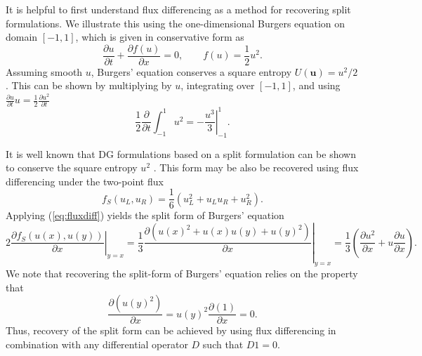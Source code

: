 \documentclass[preprint,10pt]{article}
\theoremstyle{definition}
\theoremstyle{lemma}
\theoremstyle{theorem}
\theoremstyle{assumption}
\newcommand{\pd}[2]{\frac{\partial#1}{\partial#2}}
\newcommand{\LRp}[1]{\left( #1 \right)}
\newcommand{\note}[1]{{\color{blue}{#1}}}
\begin{document}

It is helpful to first understand flux differencing as a method for recovering split formulations.  We illustrate this using the one-dimensional Burgers equation on domain $ [-1,1]$, which is given in conservative form as 
\[
\pd{u}{t} + \pd{f(u)}{x} = 0, \qquad f(u) = \frac{1}{2}u^2.
\]
Assuming smooth $u$, Burgers' equation conserves a square entropy $U(\bm{u}) = u^2/2$.   This can be shown by multiplying by $u$, integrating over $[-1,1]$, and using $\pd{u}{t}u = \frac{1}{2}\pd{u^2}{t}$
\begin{equation}
\frac{1}{2}\pd{}{t}\int_{-1}^1{u}^2 = -\left.\frac{u^3}{3}\right|_{-1}^1.
\label{eq:burgersconservation}
\end{equation}

It is well known that DG formulations based on a split formulation can be shown to conserve the square entropy $u^2$ \cite{gassner2013skew, ranocha2017extended}.  This form may be also be recovered using flux differencing under the two-point flux
\[
f_S(u_L,u_R) = \frac{1}{6}(u_L^2 + u_Lu_R + u_R^2).
\]
Applying (\ref{eq:fluxdiff}) yields the split form of Burgers' equation
\[
2\left.\pd{f_S(u(x),u(y))}{x}\right|_{y=x} = \frac{1}{3}\left.\pd{\LRp{u(x)^2 + u(x)u(y) + u(y)^2}}{x}\right|_{y=x} = \frac{1}{3}\LRp{\pd{u^2}{x} + u\pd{u}{x}}.
\]
We note that recovering the split-form of Burgers' equation relies on the property
that 
\[
\pd{\LRp{u(y)^2}}{x} = u(y)^2\pd{\LRp{1}}{x} = 0.  
\]
Thus, recovery of the split form can be achieved by using flux differencing in combination with any differential operator $D$ such that $D1 = 0$.  
\end{document}
